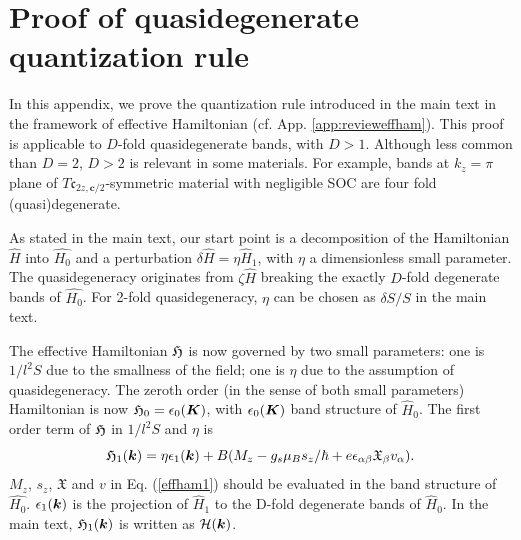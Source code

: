\documentclass[aps, prb, showpacs, twocolumn, notitlepage, superscriptaddress]{revtex4-1}
\begin{document}
\section{Proof of quasidegenerate quantization rule\label{app:quantizationruleproof}}

In this appendix, we prove the quantization rule introduced in the main text in the framework of effective Hamiltonian (cf. App. \ref{app:revieweffham}). This proof is applicable to $D$-fold quasidegenerate bands, with $D>1$. Although less common than $D=2$, $D>2$ is relevant in some materials. For example, bands at $k_z=\pi$ plane of $T\mathfrak{c}_{2z,\boldsymbol{c}/2}$-symmetric material with negligible SOC are four fold (quasi)degenerate.

As stated in the main text, our start point is a decomposition of the Hamiltonian $\hat{H}$ into $\hat{H_0}$ and a perturbation $\delta\hat{H}=\eta\hat{H}_1$, with $\eta$ a dimensionless small parameter. The quasidegeneracy originates from $\zeta\hat{H}$ breaking the exactly $D$-fold degenerate bands of $\hat{H_0}$. For 2-fold quasidegeneracy, $\eta$ can be chosen as $\delta S/S$ in the main text.

The effective Hamiltonian $\mathfrak{H}$ is now governed by two small parameters: one is $1/l^2S$ due to the smallness of the field; one is $\eta$ due to the assumption of quasidegeneracy. The zeroth order (in the sense of both small parameters) Hamiltonian is now $\mathfrak{H}_0=\epsilon_0(\boldsymbol{K})$, with $\epsilon_0(\boldsymbol{K})$ band structure of $\hat{H}_0$. The first order term of $\mathfrak{H}$ in $1/l^2S$ and $\eta$ is 
\begin{equation}
\mathfrak{H}_1(\boldsymbol{k}) = \eta\epsilon_1(\boldsymbol{k})+B(M_{z}-g_s\mu_{B}s_{z}/\hbar+e\epsilon_{\alpha\beta}\mathfrak{X}_{\beta}v_{\alpha}). \label{effham1}
\end{equation}
$M_z$, $s_z$, $\mathfrak{X}$ and $v$ in Eq. (\ref{effham1}) should be evaluated in the band structure of $\hat{H_0}$. $\epsilon_1(\boldsymbol{k})$ is the projection of $\hat{H}_1$ to the D-fold degenerate bands of $\hat{H}_0$. In the main text, $\mathfrak{H}_1(\boldsymbol{k})$ is written as $\mathcal{H}(\boldsymbol{k})$.
\end{document}
